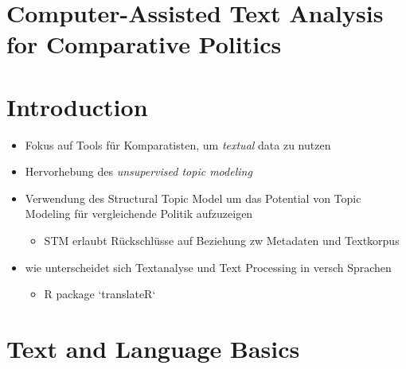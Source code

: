 \documentclass[11pt]{article}
\date{\today}
\title{}
\begin{document}
\tableofcontents

\section{Computer-Assisted Text Analysis for Comparative Politics}
\label{sec:orgf5ab55a}
\section{Introduction}
\label{sec:orgd87ee6b}
\begin{itemize}
\item Fokus auf Tools für Komparatisten, um \emph{textual} data zu nutzen
\item Hervorhebung des \emph{unsupervised topic modeling}
\item Verwendung des Structural Topic Model um das Potential von Topic Modeling für vergleichende Politik aufzuzeigen
\begin{itemize}
\item STM erlaubt Rückschlüsse auf Beziehung zw Metadaten und Textkorpus
\end{itemize}
\item wie unterscheidet sich Textanalyse und Text Processing in versch Sprachen
\begin{itemize}
\item R package `translateR`
\end{itemize}
\end{itemize}
\section{Text and Language Basics}
\label{sec:orgb538259}
\end{document}
